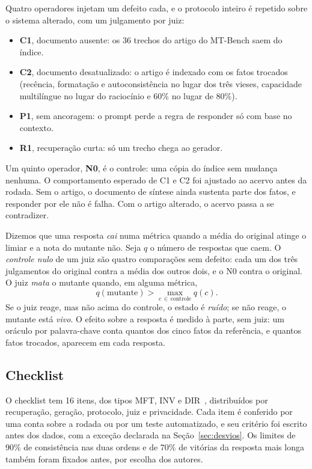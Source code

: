 \documentclass[12pt]{article}
\begin{document}
Quatro operadores injetam um defeito cada, e o protocolo inteiro é repetido sobre o
sistema alterado, com um julgamento por juiz:

\begin{itemize}
\item \textbf{C1}, documento ausente: os 36 trechos do artigo do MT-Bench saem do
índice.
\item \textbf{C2}, documento desatualizado: o artigo é indexado com os fatos
trocados (recência, formatação e autoconsistência no lugar dos três vieses,
capacidade multilíngue no lugar do raciocínio e 60\% no lugar de 80\%).
\item \textbf{P1}, sem ancoragem: o prompt perde a regra de responder só com base
no contexto.
\item \textbf{R1}, recuperação curta: só um trecho chega ao gerador.
\end{itemize}

Um quinto operador, \textbf{N0}, é o controle: uma cópia do índice sem mudança
nenhuma. O comportamento esperado de C1 e C2 foi ajustado ao acervo antes da
rodada. Sem o artigo, o documento de síntese ainda sustenta parte dos fatos, e
responder por ele não é falha. Com o artigo alterado, o acervo passa a se
contradizer.

Dizemos que uma resposta \emph{cai} numa métrica quando a média do original atinge
o limiar e a nota do mutante não. Seja $q$ o número de respostas que caem. O
\emph{controle nulo} de um juiz são quatro comparações sem defeito: cada um dos
três julgamentos do original contra a média dos outros dois, e o N0 contra o
original. O juiz \emph{mata} o mutante quando, em alguma métrica,
\begin{equation}
\label{eq:morte}
q(\text{mutante}) > \max_{c \,\in\, \text{controle}} q(c).
\end{equation}
Se o juiz reage, mas não acima do controle, o estado é \emph{ruído}; se não reage,
o mutante está \emph{vivo}. O efeito sobre a resposta é medido à parte, sem juiz:
um oráculo por palavra-chave conta quantos dos cinco fatos da referência, e quantos
fatos trocados, aparecem em cada resposta.

\subsection{Checklist}

O checklist tem 16 itens, dos tipos MFT, INV e DIR~\cite{ribeiro2020checklist},
distribuídos por recuperação, geração, protocolo, juiz e privacidade. Cada item é
conferido por uma conta sobre a rodada ou por um teste automatizado, e seu critério
foi escrito antes dos dados, com a exceção declarada na Seção~\ref{sec:desvios}. Os limites de 90\% de consistência nas duas ordens e
de 70\% de vitórias da resposta mais longa também foram fixados antes, por escolha
dos autores.
\end{document}

